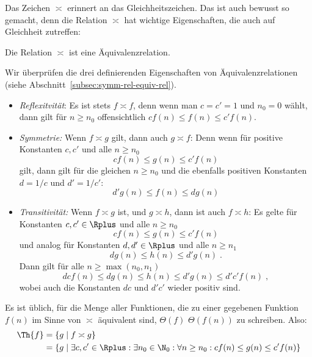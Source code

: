 Das Zeichen $\asymp$ erinnert an das Gleichheitszeichen. Das ist auch
bewusst so gemacht, denn die Relation $\asymp$ hat wichtige
Eigenschaften, die auch auf Gleichheit zutreffen:

\begin{lemma}
  Die Relation $\asymp$ ist eine Äquivalenzrelation.
\end{lemma}
% 
\begin{beweis}
  Wir überprüfen die drei definierenden Eigenschaften von
  Äquivalenzrelationen (siehe
  Abschnitt~\ref{subsec:symm-rel-equiv-rel}).
  \begin{itemize}
  \item \emph{Reflexitvität}: Es ist stets $f\asymp f$, denn wenn man
    $c=c'=1$ und $n_0=0$ wählt, dann gilt für $n\geq n_0$ offensichtlich
    $c f(n) \leq f(n) \leq c' f(n)$.
  \item \emph{Symmetrie:} Wenn $f\asymp g$ gilt, dann auch $g\asymp f$:
    Denn wenn für positive Konstanten $c, c'$ und alle $n\geq n_0$ 
    \[
    c f(n) \leq g(n) \leq c' f(n)
    \]
    gilt, dann gilt für die gleichen $n\geq n_0$ und die ebenfalls
    positiven Konstanten $d=1/c$ und $d'=1/c'$:
    \[
    d' g(n) \leq f(n) \leq d g(n)
    \]
  \item \emph{Transitivität:} Wenn $f\asymp g$ ist, und $g\asymp h$,
    dann ist auch $f\asymp h$: Es gelte für Konstanten $c,c'\in\Rplus$ und
    alle $n\geq n_0$
    \[
    c f(n) \leq g(n) \leq c' f(n)
    \]
    und analog für Konstanten $d,d'\in\Rplus$ und alle $n\geq n_1$
    \[
    d g(n) \leq h(n) \leq d' g(n) \;.
    \]
    Dann gilt für alle $n\geq \max(n_0, n_1)$
    \[
    dc f(n) \leq d g(n) \leq h(n) \leq d' g(n) \leq d'c' f(n) \;,
    \]
    wobei auch die Konstanten  $dc$ und $d'c'$ wieder positiv sind.
  \end{itemize}
\end{beweis}
% 
Es ist üblich, für die Menge aller Funktionen, die zu einer gegebenen
Funktion $f(n)$ im Sinne von $\asymp$ äquivalent sind,
$\Theta(f)$ \bzw
$\Theta(f(n))$ zu schreiben. Also:
\begin{align*}
  \Th{f} &= \{ g \mid f \asymp g \} \\
  &= \{ g \mid \exists c,c'\in \Rplus: \exists n_0\in \N_0: \forall  n\geq n_0: c f(n) \leq g(n) \leq c' f(n) \} 
\end{align*}

